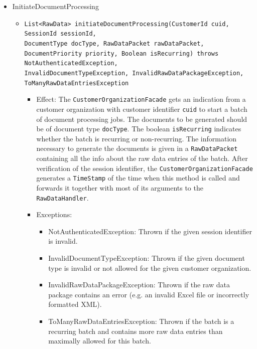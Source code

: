 \documentclass[a4paper,10pt]{article}
\begin{document}
\begin{itemize}
    \item InitiateDocumentProcessing
    \begin{itemize}
    	\item \texttt{List<RawData> initiateDocumentProcessing(CustomerId cuid, SessionId sessionId, \\DocumentType docType, RawDataPacket rawDataPacket, \\ DocumentPriority priority, Boolean isRecurring) throws NotAuthenticatedException,\\ InvalidDocumentTypeException, InvalidRawDataPackageException, ToManyRawDataEntriesException }
    	 \begin{itemize}
            \item Effect: The \texttt{CustomerOrganizationFacade} gets an indication from a customer organization with customer identifier \texttt{cuid} to start a batch of document processing jobs. The documents to be generated should be of document type \texttt{docType}. The boolean \texttt{isRecurring} indicates whether the batch is recurring or non-recurring. The information necessary to generate the documents is given in  a \texttt{RawDataPacket} containing all the info about the raw data entries of the batch. After verification of the session identifier, the \texttt{CustomerOrganizationFacade} generates a \texttt{TimeStamp} of the time when this method is called and forwards it together with most of its arguments to the \texttt{RawDataHandler}.
            \item Exceptions:
            \begin{itemize}
            	\item NotAuthenticatedException: Thrown if the given session identifier is invalid.
            	\item InvalidDocumentTypeException: Thrown if the given document type is invalid or not allowed for the given customer organization.
            	\item InvalidRawDataPackageException: Thrown if the raw data package contains an error (e.g. an invalid Excel file or incorrectly formatted XML).
            	\item ToManyRawDataEntriesException: Thrown if the batch is a recurring batch and contains more raw data entries than maximally allowed for this batch.
            \end{itemize}
        \end{itemize}  	
    \end{itemize}
\end{itemize}
\end{document}
